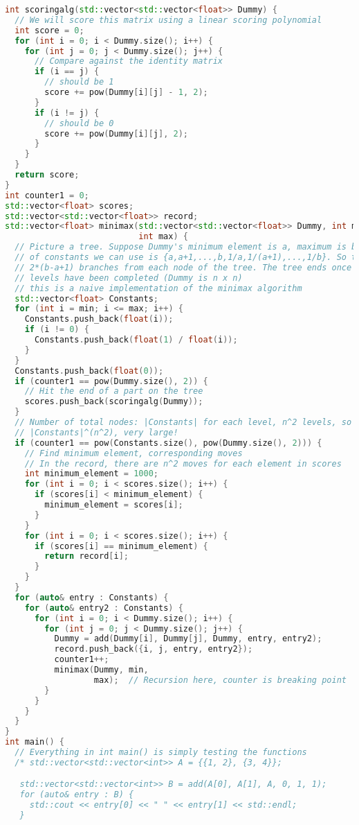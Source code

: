 \documentclass{article}
\begin{document}
\begin{lstlisting}[language=C++]
int scoringalg(std::vector<std::vector<float>> Dummy) {
  // We will score this matrix using a linear scoring polynomial
  int score = 0;
  for (int i = 0; i < Dummy.size(); i++) {
    for (int j = 0; j < Dummy.size(); j++) {
      // Compare against the identity matrix
      if (i == j) {
        // should be 1
        score += pow(Dummy[i][j] - 1, 2);
      }
      if (i != j) {
        // should be 0
        score += pow(Dummy[i][j], 2);
      }
    }
  }
  return score;
}
int counter1 = 0;
std::vector<float> scores;
std::vector<std::vector<float>> record;
std::vector<float> minimax(std::vector<std::vector<float>> Dummy, int min,
                           int max) {
  // Picture a tree. Suppose Dummy's minimum element is a, maximum is b. The set
  // of constants we can use is {a,a+1,...,b,1/a,1/(a+1),...,1/b}. So there are
  // 2*(b-a+1) branches from each node of the tree. The tree ends once n^2
  // levels have been completed (Dummy is n x n)
  // this is a naive implementation of the minimax algorithm
  std::vector<float> Constants;
  for (int i = min; i <= max; i++) {
    Constants.push_back(float(i));
    if (i != 0) {
      Constants.push_back(float(1) / float(i));
    }
  }
  Constants.push_back(float(0));
  if (counter1 == pow(Dummy.size(), 2)) {
    // Hit the end of a part on the tree
    scores.push_back(scoringalg(Dummy));
  }
  // Number of total nodes: |Constants| for each level, n^2 levels, so
  // |Constants|^(n^2), very large!
  if (counter1 == pow(Constants.size(), pow(Dummy.size(), 2))) {
    // Find minimum element, corresponding moves
    // In the record, there are n^2 moves for each element in scores
    int minimum_element = 1000;
    for (int i = 0; i < scores.size(); i++) {
      if (scores[i] < minimum_element) {
        minimum_element = scores[i];
      }
    }
    for (int i = 0; i < scores.size(); i++) {
      if (scores[i] == minimum_element) {
        return record[i];
      }
    }
  }
  for (auto& entry : Constants) {
    for (auto& entry2 : Constants) {
      for (int i = 0; i < Dummy.size(); i++) {
        for (int j = 0; j < Dummy.size(); j++) {
          Dummy = add(Dummy[i], Dummy[j], Dummy, entry, entry2);
          record.push_back({i, j, entry, entry2});
          counter1++;
          minimax(Dummy, min,
                  max);  // Recursion here, counter is breaking point
        }
      }
    }
  }
}
int main() {
  // Everything in int main() is simply testing the functions
  /* std::vector<std::vector<int>> A = {{1, 2}, {3, 4}};

   std::vector<std::vector<int>> B = add(A[0], A[1], A, 0, 1, 1);
   for (auto& entry : B) {
     std::cout << entry[0] << " " << entry[1] << std::endl;
   }


\end{lstlisting}
\end{document}
